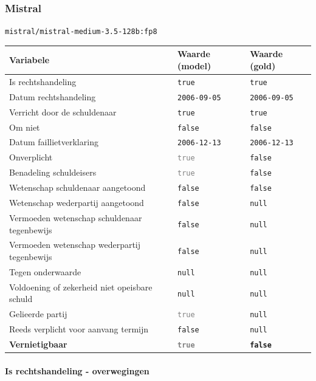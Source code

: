 \documentclass[
  dutch,
  a4paper,
]{article}
\begin{document}
\subsubsection{Mistral}\label{mistral-26}

\texttt{mistral/mistral-medium-3.5-128b:fp8}

\begin{center}
\small
\begin{tabular}{@{}p{7.4cm}p{2.6cm}p{2.6cm}@{}}
\toprule
Variabele & Waarde (model) & Waarde (gold) \\
\midrule
Is rechtshandeling & \texttt{true} & \texttt{true} \\
Datum rechtshandeling & \texttt{2006-09-05} & \texttt{2006-09-05} \\
Verricht door de schuldenaar & \texttt{true} & \texttt{true} \\
Om niet & \texttt{false} & \texttt{false} \\
Datum faillietverklaring & \texttt{2006-12-13} & \texttt{2006-12-13} \\
Onverplicht & \textcolor{gray}{\texttt{true}} & \texttt{false} \\
Benadeling schuldeisers & \textcolor{gray}{\texttt{true}} & \texttt{false} \\
Wetenschap schuldenaar aangetoond & \texttt{false} & \texttt{false} \\
Wetenschap wederpartij aangetoond & \texttt{false} & \texttt{null} \\
Vermoeden wetenschap schuldenaar tegenbewijs & \texttt{false} & \texttt{null} \\
Vermoeden wetenschap wederpartij tegenbewijs & \texttt{false} & \texttt{null} \\
Tegen onderwaarde & \texttt{null} & \texttt{null} \\
Voldoening of zekerheid niet opeisbare schuld & \texttt{null} & \texttt{null} \\
Gelieerde partij & \textcolor{gray}{\texttt{true}} & \texttt{null} \\
Reeds verplicht voor aanvang termijn & \texttt{false} & \texttt{null} \\
\textbf{Vernietigbaar} & \textbf{\textcolor{gray}{\texttt{true}}} & \textbf{\texttt{false}} \\
\bottomrule
\end{tabular}
\end{center}

\paragraph{Is rechtshandeling - overwegingen}\label{is-rechtshandeling---overwegingen-78}
\end{document}

